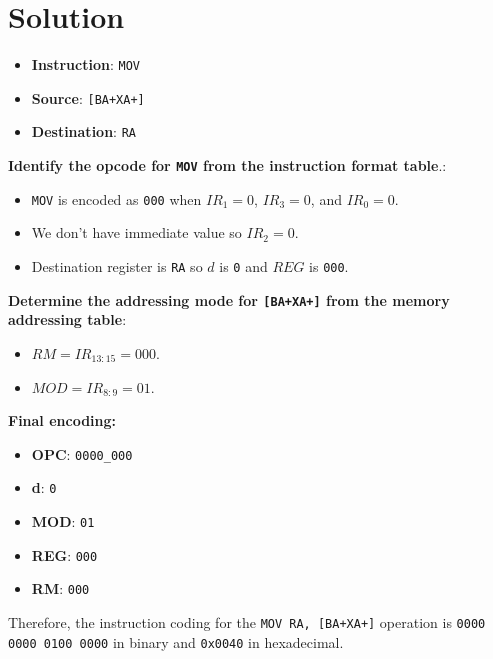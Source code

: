 \section*{Solution}

\begin{itemize}
    \item \textbf{Instruction}: \texttt{MOV}
    \item \textbf{Source}: \texttt{[BA+XA+]}
    \item \textbf{Destination}: \texttt{RA}
\end{itemize}

\textbf{Identify the opcode for \texttt{MOV} from the instruction format table}.:
\begin{itemize}
    \item \texttt{MOV} is encoded as \texttt{000} when $IR_{1}=0$, $IR_{3}=0$, and $IR_{0}=0$.
    \item We don't have immediate value so $IR_{2}=0$.
    \item Destination register is \texttt{RA} so $d$ is \texttt{0} and $REG$ is \texttt{000}.
\end{itemize}

\textbf{Determine the addressing mode for \texttt{[BA+XA+]} from the memory addressing table}:
\begin{itemize}
    \item $RM=IR_{13:15}=000$.
    \item $MOD=IR_{8:9}=01$.
\end{itemize}

\textbf{Final encoding:}
\begin{itemize}
    \item \textbf{OPC}: \texttt{0000\_000}
    \item \textbf{d}: \texttt{0}
    \item \textbf{MOD}: \texttt{01}
    \item \textbf{REG}: \texttt{000}
    \item \textbf{RM}: \texttt{000}
\end{itemize}

Therefore, the instruction coding for the \texttt{MOV RA, [BA+XA+]} operation is \texttt{0000 0000 0100 0000} in binary and \texttt{0x0040} in hexadecimal.